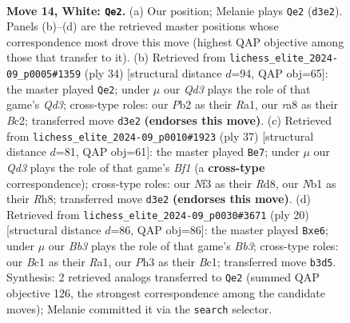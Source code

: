 \documentclass[11pt]{article}
\begin{document}
\clearpage

\begin{figure}[p]\centering
\begin{subfigure}{0.46\textwidth}\centering
\resizebox{\linewidth}{!}{%
\newchessgame
\chessboard[
  setfen={rnbqr1k1/pp1n1pb1/4p1pp/3p4/P2P4/1B1Q1N1P/RPP2PP1/1NB1R1K1 w - - 1 14},
  showmover=false,
  pgfstyle=straightmove, color=movearrow, markmove={d3-e2}
]}
\caption{}
\end{subfigure}\hfill
\begin{subfigure}{0.46\textwidth}\centering
\resizebox{\linewidth}{!}{%
\newchessgame
\chessboard[
  setfen={2rqrnk1/1b2bpp1/p3p2p/1ppn4/3P4/2PQ1NNP/PPB2PP1/R1B1R1K1 w - - 4 18},
  showmover=false,
  pgfstyle=straightmove, color=movearrow, markmove={d3-e2}
]}
\caption{}
\end{subfigure}
\\[4pt]
\begin{subfigure}{0.46\textwidth}\centering
\resizebox{\linewidth}{!}{%
\newchessgame
\chessboard[
  setfen={1k1r1b1r/ppp3pp/4q1b1/2P1pp2/1P1n4/3PN2B/P4PPP/1RBQR1K1 b - - 3 19},
  showmover=false,
  pgfstyle=straightmove, color=movearrow, markmove={f8-e7}
]}
\caption{}
\end{subfigure}\hfill
\begin{subfigure}{0.46\textwidth}\centering
\resizebox{\linewidth}{!}{%
\newchessgame
\chessboard[
  setfen={rn1qk2r/1b2b1pp/p2ppn2/1p6/4PP2/1BN5/PPP3PP/R1BQ1RK1 w kq - 0 11},
  showmover=false,
  pgfstyle=straightmove, color=movearrow, markmove={b3-e6}
]}
\caption{}
\end{subfigure}
\caption{\textbf{Move 14, White: \texttt{Qe2}.} (a) Our position; Melanie plays \texttt{Qe2} (\texttt{d3e2}). Panels (b)--(d) are the retrieved master positions whose correspondence most drove this move (highest QAP objective among those that transfer to it). (b) Retrieved from \texttt{lichess\_elite\_2024-09\_p0005\#1359} (ply 34) [structural distance $d$=94, QAP obj=65]: the master played \texttt{Qe2}; under $\mu$ our \emph{Qd3} plays the role of that game's \emph{Qd3}; cross-type roles: our \emph{P}b2 as their \emph{R}a1, our \emph{r}a8 as their \emph{B}c2; transferred move \texttt{d3e2} \textbf{(endorses this move)}. (c) Retrieved from \texttt{lichess\_elite\_2024-09\_p0010\#1923} (ply 37) [structural distance $d$=81, QAP obj=61]: the master played \texttt{Be7}; under $\mu$ our \emph{Qd3} plays the role of that game's \emph{Bf1} (a \textbf{cross-type} correspondence); cross-type roles: our \emph{N}f3 as their \emph{R}d8, our \emph{N}b1 as their \emph{R}h8; transferred move \texttt{d3e2} \textbf{(endorses this move)}. (d) Retrieved from \texttt{lichess\_elite\_2024-09\_p0030\#3671} (ply 20) [structural distance $d$=86, QAP obj=86]: the master played \texttt{Bxe6}; under $\mu$ our \emph{Bb3} plays the role of that game's \emph{Bb3}; cross-type roles: our \emph{B}c1 as their \emph{R}a1, our \emph{P}h3 as their \emph{B}c1; transferred move \texttt{b3d5}. Synthesis: 2 retrieved analogs transferred to \texttt{Qe2} (summed QAP objective 126, the strongest correspondence among the candidate moves); Melanie committed it via the \texttt{search} selector.}
\label{fig:thought-m26}
\end{figure}
\end{document}
